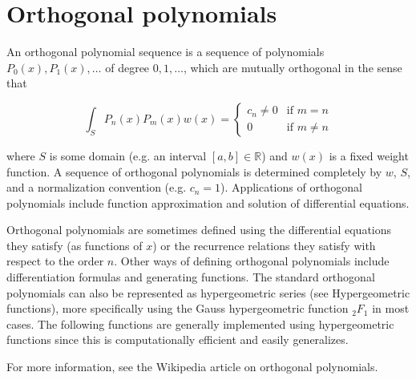 \newpage
\chapter{Orthogonal polynomials}
An orthogonal polynomial sequence is a sequence of polynomials $P_0(x), P_1(x),\ldots$ of degree $0, 1, \ldots$, which are mutually orthogonal in the sense that

\begin{equation}
  \int_S P_n(x) P_m(x) w(x) = \begin{cases}
    c_n \neq 0 & \text{if } m=n\\
    0 & \text{if } m \neq n
  \end{cases}
\end{equation}

where $S$ is some domain (e.g. an interval $[a, b] \in \mathbb{R}$) and $w(x)$ is a fixed weight function. A
sequence of orthogonal polynomials is determined completely by $w$, $S$, and a normalization convention (e.g. $c_n=1$). Applications of orthogonal polynomials include function approximation and solution of differential equations.

\vpara
Orthogonal polynomials are sometimes defined using the differential equations they satisfy (as functions of $x$) or the recurrence relations they satisfy with respect to the order $n$. Other ways of defining orthogonal polynomials include differentiation formulas and generating
functions. The standard orthogonal polynomials can also be represented as hypergeometric series (see Hypergeometric functions), more specifically using the Gauss hypergeometric function ${}_2F_1$ in most cases. The following functions are generally implemented using hypergeometric functions since this is computationally efficient and easily generalizes.

For more information, see the Wikipedia article on orthogonal polynomials.

